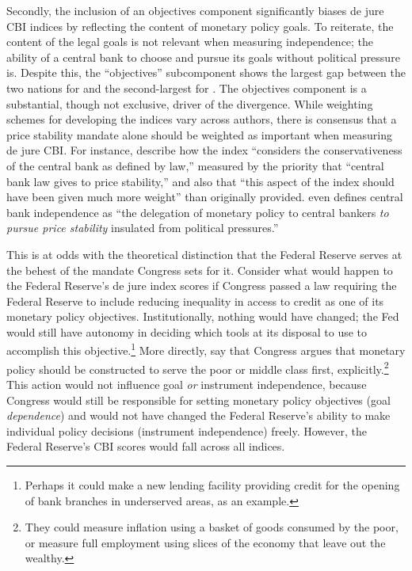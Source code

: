 \documentclass[12pt,a4paper]{article}
\begin{document}
\begin{doublespace}
Secondly, the inclusion of an objectives component significantly biases de jure CBI indices by reflecting the content of monetary policy goals. To reiterate, the content of the legal goals is not relevant when measuring independence; the ability of a central bank to choose and pursue its goals without political pressure is. Despite this, the ``objectives'' subcomponent shows the largest gap between the two nations for \textcite{romelli_trends_2024} and the second-largest for \textcite{garriga_revisiting_2025}. The objectives component is a substantial, though not exclusive, driver of the divergence. While weighting schemes for developing the indices vary across authors, there is consensus that a price stability mandate alone should be weighted as important when measuring de jure CBI. For instance, \textcite[4]{eijffinger_central_2026} describe how the \textcite{cukierman_measuring_1992} index ``considers the conservativeness of the central bank as defined by law,'' measured by the priority that ``central bank law gives to price stability,'' and also that ``this aspect of the index should have been given much more weight'' than \textcite{cukierman_measuring_1992} originally provided. \textcite[2]{garriga_revisiting_2025} even defines central bank independence as ``the delegation of monetary policy to central bankers \textit{to pursue price stability} insulated from political pressures.''


This is at odds with the theoretical distinction that the Federal Reserve serves at the behest of the mandate Congress sets for it. Consider what would happen to the Federal Reserve's de jure index scores if Congress passed a law requiring the Federal Reserve to include reducing inequality in access to credit as one of its monetary policy objectives. Institutionally, nothing would have changed; the Fed would still have autonomy in deciding which tools at its disposal to use to accomplish this objective.\footnote{Perhaps it could make a new lending facility providing credit for the opening of bank branches in underserved areas, as an example.} More directly, say that Congress argues that monetary policy should be constructed to serve the poor or middle class first, explicitly.\footnote{They could measure inflation using a basket of goods consumed by the poor, or measure full employment using slices of the economy that leave out the wealthy.} This action would not influence goal \textit{or} instrument independence, because Congress would still be responsible for setting monetary policy objectives (goal \textit{dependence}) and would not have changed the Federal Reserve's ability to make individual policy decisions (instrument independence) freely. However, the Federal Reserve's CBI scores would fall across all indices.



\end{doublespace}
\end{document}
